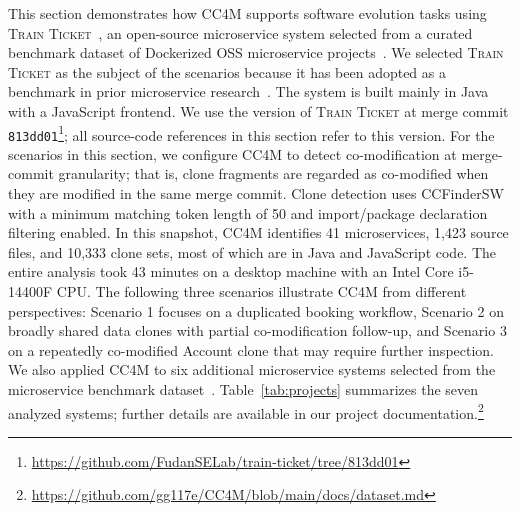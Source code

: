 \documentclass[conference]{IEEEtran}
\begin{document}
This section demonstrates how \textsc{CC4M} supports software evolution
tasks using \textsc{Train Ticket}~\cite{Zhou2018Benchmarking,Zhou2021TrainTicket},
an open-source microservice system selected from a curated benchmark
dataset of Dockerized OSS microservice projects~\cite{Amoroso2024MSR}.
We selected \textsc{Train Ticket} as the subject of the scenarios because
it has been adopted as a benchmark in prior microservice
research~\cite{Mo2021ESEM,Zhao2022ICPC,Cerny2025SANER}.
The system is built mainly in Java with a JavaScript frontend.
We use the version of \textsc{Train Ticket} at merge commit
\texttt{813dd01}\footnote{\url{https://github.com/FudanSELab/train-ticket/tree/813dd01}};
all source-code references in this section refer to this version.
For the scenarios in this section, we configure \textsc{CC4M} to detect
co-modification at merge-commit granularity; that is, clone fragments
are regarded as co-modified when they are modified in the same merge
commit. Clone detection uses CCFinderSW with a minimum matching
token length of 50 and import/package declaration filtering enabled.
In this snapshot, \textsc{CC4M} identifies 41 microservices, 1{,}423
source files, and 10{,}333 clone sets, most of which are in Java and
JavaScript code. The entire analysis took 43 minutes on a desktop
machine with an Intel Core i5-14400F CPU.
The following three scenarios illustrate \textsc{CC4M} from different
perspectives: Scenario 1 focuses on a duplicated booking workflow,
Scenario 2 on broadly shared data clones with partial co-modification
follow-up, and Scenario 3 on a repeatedly co-modified Account clone
that may require further inspection.
We also applied \textsc{CC4M} to six additional microservice systems
selected from the microservice benchmark dataset~\cite{Amoroso2024MSR}.
Table~\ref{tab:projects} summarizes the seven analyzed systems; further
details are available in our project
documentation.\footnote{\url{https://github.com/gg117e/CC4M/blob/main/docs/dataset.md}}
\end{document}
